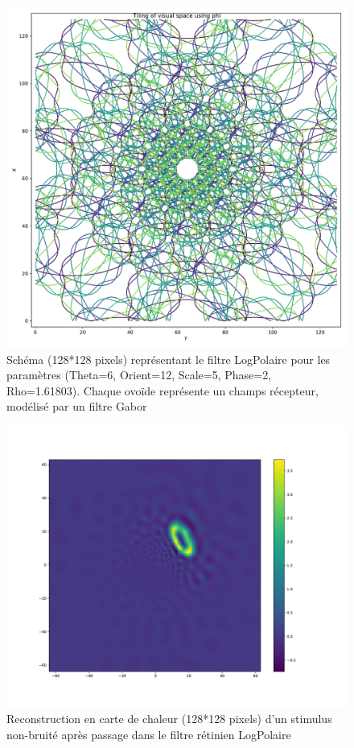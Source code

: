 \begin{figure}[th]
\centering
\includegraphics[scale=0.4]{Figures/logpol_filter}
\decoRule
\caption[Figure]{Schéma (128*128 pixels) représentant le filtre LogPolaire pour les paramètres (Theta=6, Orient=12, Scale=5, Phase=2, Rho=1.61803). Chaque ovoïde représente un champs récepteur, modélisé par un filtre Gabor \autocite{Freeman2011}}
\label{fig:logpol_filter}
\end{figure}

\begin{figure}[th]
\centering
\includegraphics[scale=0.4]{Figures/mnist_128_LP_nonoise}
\decoRule
\caption[Figure]{Reconstruction en carte de chaleur (128*128 pixels) d'un stimulus non-bruité après passage dans le filtre rétinien LogPolaire}
\label{fig:mnist_128_LP_nonoise}
\end{figure}

